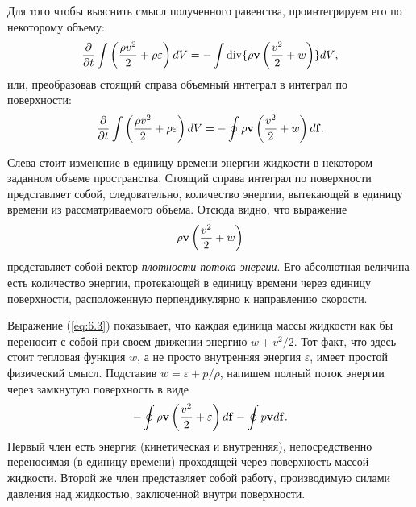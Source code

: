 Для того чтобы выяснить смысл полученного равенства, проинтегрируем его по
некоторому объему:
\[
   \frac{\partial}{\partial t}\int{\left(\frac{\rho v^2}{2}+\rho\varepsilon\right)dV} =
   - \int{\mathop{\mathrm{div}}\nolimits\lbrace\rho { \mathbf{v} }\left(\frac{v^2}{2}+w\right)\rbrace dV},
\]
или, преобразовав стоящий справа объемный интеграл в интеграл по поверхности:
\begin{equation}
   \label{eq:6.2}
   \frac{\partial}{\partial t}\int{\left(\frac{\rho v^2}{2}+\rho\varepsilon\right)dV} =
   - \oint{\rho { \mathbf{v} }\left(\frac{v^2}{2}+w\right) d\mathbf{f} }.
\end{equation}

Слева стоит изменение в единицу времени энергии жидкости в некотором заданном
объеме пространства. Стоящий справа интеграл по поверхности представляет собой,
следовательно, количество энергии, вытекающей в единицу времени из
рассматриваемого объема. Отсюда видно, что выражение
\begin{equation}
   \label{eq:6.3}
   \rho { \mathbf{v} } \left(\frac{v^2}{2}+w\right)
\end{equation}
представляет собой вектор \textit{плотности потока энергии}. Его абсолютная
величина есть количество энергии, протекающей в единицу времени через единицу
поверхности, расположенную перпендикулярно к направлению скорости.

Выражение (\ref{eq:6.3}) показывает, что каждая единица массы жидкости как бы переносит с
собой при своем движении энергию $w+v^2/2$. Тот факт, что здесь стоит тепловая
функция $w$, а не просто внутренняя энергия $\varepsilon$, имеет простой
физический смысл. Подставив $w = \varepsilon + p/\rho$, напишем полный поток
энергии через замкнутую поверхность в виде
\[
   - \oint{\rho { \mathbf{v} }\left(\frac{v^2}{2}+\varepsilon\right) d\mathbf{f} }-
   \oint{p{ \mathbf{v} } d\mathbf{f} }.
\]
Первый член есть энергия (кинетическая и внутренняя), непосредственно
переносимая (в единицу времени) проходящей через поверхность массой жидкости.
Второй же член представляет собой работу, производимую силами давления над
жидкостью, заключенной внутри поверхности.

